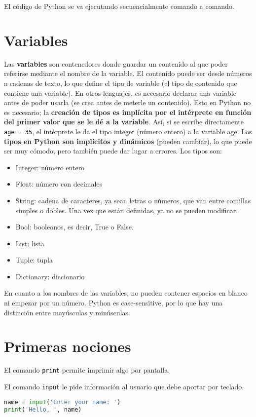 El código de Python se va ejecutando secuencialmente comando a comando. 

\section{Variables}
Las \textbf{variables} son contenedores donde guardar un contenido al que poder referirse mediante el nombre de la variable. El contenido puede ser desde números a cadenas de texto, lo que define el tipo de variable (el tipo de contenido que contiene una variable). En otros lenguajes, es necesario declarar una variable antes de poder usarla (se crea antes de meterle un contenido). Esto en Python no es necesario; la \textbf{creación de tipos es implícita por el intérprete en función del primer valor que se le dé a la variable}. Así, si se escribe directamente \texttt{age = 35}, el intérprete le da el tipo integer (número entero) a la variable age. Los \textbf{tipos en Python son implícitos y dinámicos} (pueden cambiar), lo que puede ser muy cómodo, pero también puede dar lugar a errores. Los tipos son:
\begin{itemize}
\item Integer: número entero
\item Float: número con decimales
\item String: cadena de caracteres, ya sean letras o números, que van entre comillas simples o dobles. Una vez que están definidas, ya no se pueden modificar.
\item Bool: booleanos, es decir, True o False.
\item List: lista
\item Tuple: tupla
\item Dictionary: diccionario
\end{itemize}

En cuanto a los nombres de las variables, no pueden contener espacios en blanco ni empezar por un número. Python es case-sensitive, por lo que hay una distinción entre mayúsculas y minúsculas. 

\section{Primeras nociones}
El comando \texttt{print} permite imprimir algo por pantalla. 

El comando \texttt{input} le pide información al usuario que debe aportar por teclado.
\begin{lstlisting}[language=Python]
name = input('Enter your name: ')
print('Hello, ', name)
\end{lstlisting}

